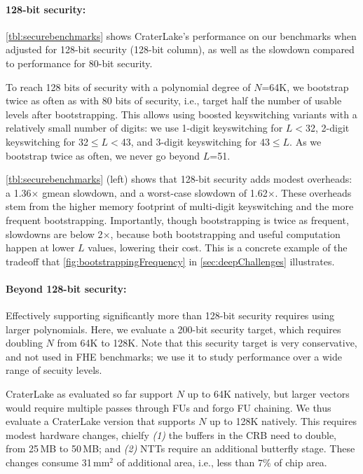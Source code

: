 \paragraph{128-bit security:}
\autoref{tbl:securebenchmarks} shows CraterLake's performance on our benchmarks
when adjusted for 128-bit security (128-bit column), as well as the slowdown
compared to performance for 80-bit security.

\tblSecureBenchmarks

To reach 128 bits of security with a polynomial degree of $N$=64K, we bootstrap
twice as often as with 80 bits of security, i.e., target half the number of
usable levels after bootstrapping. This allows using boosted keyswitching
variants with a relatively small number of digits: we use 1-digit keyswitching
for $L<$32, 2-digit keyswitching for 32$\leq L<$43, and 3-digit keyswitching
for 43$\leq L$. As we bootstrap twice as often, we never go beyond $L$=51.

\autoref{tbl:securebenchmarks} (left) shows that 128-bit security adds modest
overheads: a 1.36$\times$ gmean slowdown, and a worst-case slowdown of
1.62$\times$. These overheads stem from the higher memory footprint of
multi-digit keyswitching and the more frequent bootstrapping. Importantly,
though bootstrapping is twice as frequent, slowdowns are below 2$\times$,
because both bootstrapping and useful computation happen at lower $L$ values,
lowering their cost. This is a concrete example of the tradeoff that
\autoref{fig:bootstrappingFrequency} in \autoref{sec:deepChallenges}
illustrates.

\paragraph{Beyond 128-bit security:}
Effectively supporting significantly more than 128-bit security requires using
larger polynomials. Here, we evaluate a 200-bit security target, which requires
doubling $N$ from 64K to 128K. Note that this security target is very
conservative, and not used in FHE benchmarks; we use it to study performance
over a wide range of secuity levels.

CraterLake as evaluated so far support $N$ up to 64K natively, but larger
vectors would require multiple passes through FUs and forgo FU chaining. We
thus evaluate a CraterLake version that supports $N$ up to 128K natively. This
requires modest hardware changes, chielfy \emph{(1)} the buffers in the CRB
need to double, from 25$\,$MB to 50$\,$MB; and \emph{(2)} NTTs require an
additional butterfly stage. These changes consume 31$\,$mm$^2$ of additional
area, i.e., less than $7\%$ of chip area.

